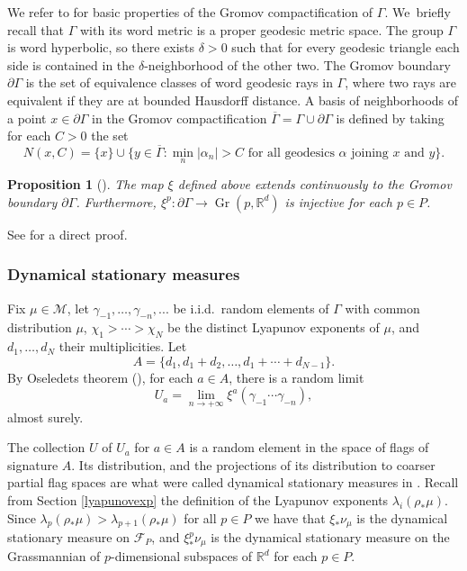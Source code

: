 \documentclass[JEP,XML,SOM,Unicode,NoEqCountersInSection,published]{cedram}
\let\ts\textstyle
\newtheorem{proposition}[theorem]{Proposition}
\newcommand{\R}{\mathbb{R}}
\newcommand{\F}{\mathcal{F}}
\newcommand{\M}{\mathcal M}
\let\g\gamma
\DeclareMathOperator{\Gr}{Gr}
\begin{document}
We refer to \cite[Chap.\,7]{GdlH90} for basic properties of the Gromov compactification of \(\Gamma\). We~briefly recall that \(\Gamma\) with its word metric is a proper geodesic metric space.
The group \(\Gamma\) is word hyperbolic, so there exists \(\delta > 0\) such that for every geodesic triangle each side is contained in the \(\delta\)-neighborhood of the other two.
The Gromov boundary \(\partial \Gamma\) is the set of equivalence classes of word geodesic rays in \(\Gamma\), where two rays are equivalent if they are at bounded Hausdorff distance.
A basis of neighborhoods of a point \(x \in \partial \Gamma\) in the Gromov compactification \(\overline{\Gamma} = \Gamma \cup \partial \Gamma\) is defined by taking for each \(C > 0\) the set
\[
\ts N(x,C) = \lbrace x\rbrace \cup \lbrace y \in \overline{\Gamma}: \min_{n} |\alpha_n| > C\text{ for all geodesics }\alpha\text{ joining }x\text{ and }y\rbrace.
\]

\begin{proposition}[\cite{GGKW17}]\label{boundarymapstheorem}
The map \(\xi\) defined above extends continuously to the Gromov boundary \(\partial \Gamma\). Furthermore, \(\xi^p:\partial\Gamma \to \Gr(p,\R^d)\) is injective for each \(p \in P\).
\end{proposition}

See \cite[Prop.\,30.3]{canary} for a direct proof.

\subsubsection{Dynamical stationary measures}

Fix \(\mu \in \M\), let \(\g_{-1},\ldots, \g_{-n},..\). be i.i.d.\ random elements of \(\Gamma\) with common distribution \(\mu\), \(\chi_1 > \cdots > \chi_N\) be the distinct Lyapunov exponents of \(\mu\), and \(d_1,\ldots, d_N\) their multiplicities.
Let
\[
A = \lbrace d_1, d_1+d_2,\ldots, d_1+\cdots + d_{N-1} \rbrace.
\]
By Oseledets theorem (\cite{Ose68}), for each \(a \in A\), there is a random limit
\[
U_a = \lim_{n \to +\infty} \xi^a(\g_{-1}\cdots \g_{-n}),
\]
almost surely.

The collection \(U\) of \(U_a\) for \(a \in A\) is a random element in the space of flags of signature \(A\). Its distribution, and the projections of its distribution to coarser partial flag spaces are what were called dynamical stationary measures in \cite{LL23}. Recall from Section \ref{lyapunovexp} the definition of the Lyapunov exponents \(\lambda_i(\rho_*\mu)\). Since \(\lambda_p(\rho_*\mu) > \lambda_{p+1}(\rho_*\mu)\) for all \(p \in P\) we have that \(\xi_*\nu_\mu\) is the dynamical stationary measure on \(\F_P\), and \(\xi^p_*\nu_\mu\) is the dynamical stationary measure on the Grassmannian of \(p\)-dimensional subspaces of \(\R^d\) for each \(p \in P\).
\end{document}
